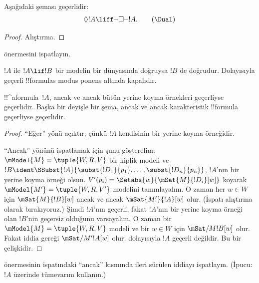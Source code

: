 \documentclass[../../../include/open-logic-section]{subfiles}
\begin{document}
\begin{prop}
  Aşağıdaki \Dual{} şeması geçerlidir:
  \begin{equation*}
  \Diamond !A \liff \lnot\Box\lnot !A. \tag{\Dual}
  \end{equation*}
\end{prop}

\begin{proof}
  Alıştırma.
\end{proof}

\begin{prob}
   önermesini ispatlayın.
\end{prob}

\begin{prop}
  $!A$ ile $!A \lif !B$ bir modelin bir dünyasında doğruysa $!B$ de
  doğrudur. Dolayısıyla geçerli !!{formula}s modus ponens altında kapalıdır.
\end{prop}

\begin{prop}
  !!^a{formula}~$!A$, ancak ve ancak bütün yerine koyma örnekleri geçerliyse
  geçerlidir. Başka bir deyişle bir şema, ancak ve ancak karakteristik
  !!{formula} geçerliyse geçerlidir.
\end{prop}

\begin{proof}
  ``Eğer'' yönü açıktır; çünkü $!A$ kendisinin bir yerine koyma örneğidir.

  ``Ancak'' yönünü ispatlamak için şunu gösterelim: $\mModel{M} =
  \tuple{W, R, V}$ bir kiplik modeli ve $!B \ident
  \SSubst{!A}{\subst{!D_1}{p_1},\dots,\subst{!D_n}{p_n}}$, $!A$'nın bir
  yerine koyma örneği olsun. $V'(p_i) =
  \Setabs{w}{\mSat{M}{!D_i}[w]}$ koyarak $\mModel{M'} = \tuple{W, R,
    V'}$ modelini tanımlayalım. O zaman her $w \in W$ için
  $\mSat{M}{!B}[w]$ ancak ve ancak $\mSat{M'}{!A}[w]$ olur. (İspatı
  alıştırma olarak bırakıyoruz.) Şimdi $!A$'nın geçerli, fakat $!A$'nın bir
  yerine koyma örneği olan $!B$'nin geçersiz olduğunu varsayalım. O zaman
  bir $\mModel{M} = \tuple{W, R, V}$ modeli ve bir $w \in W$ için
  $\mSat/{M}{!B}[w]$ olur. Fakat iddia gereği
  $\mSat/{M'}{!A}[w]$ olur; dolayısıyla $!A$ geçerli değildir. Bu bir
  çelişkidir.
\end{proof}

\begin{prob}
   önermesinin ispatındaki
  ``ancak'' kısmında ileri sürülen iddiayı ispatlayın. (İpucu: $!A$ üzerinde
  tümevarım kullanın.)
\end{prob}
\end{document}
